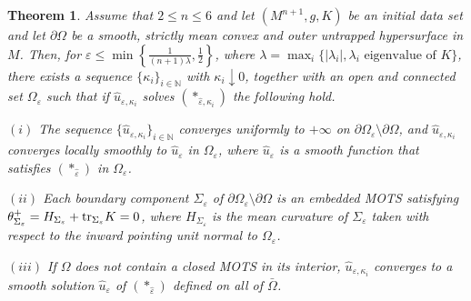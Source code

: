 \documentclass[11pt]{amsart}
\newtheorem{Theorem}{Theorem}
\renewcommand{\epsilon}{\varepsilon}
\def\N{\mathbb{N}}
\def\e{\epsilon}
\def\l{\lambda}
\def\k{\kappa}
\begin{document}
\begin{Theorem}\label{kto0}
Assume that $2\le n\le 6$ and let $(M^{n+1},g,K)$ be an initial data set and let $\partial\Omega$ be a smooth, strictly mean convex and outer untrapped  hypersurface in $M$. Then, for  $\e\le \min\left\{\frac{1}{(n+1)\lambda},\frac12\right\}$, where $\lambda=\max_i\{|\l_i|, \l_i\text{  eigenvalue of  } K\}$, there exists a sequence $\{\k_i\}_{i\in\N}$ with $\kappa_i\downarrow0$, together with an open and connected set $\Omega_\e$  such that if $\hat{u}_{\varepsilon,\k_i}$ solves $(*_{\hat{\varepsilon},\k_i})$ the following hold.

$(i)$ The sequence $\{\hat{u}_{\varepsilon, \k_i}\}_{i\in\N}$ converges  uniformly to $+\infty$ on $\partial\Omega_\e\setminus \partial \Omega$, and 
$\hat{u}_{\varepsilon,\k_i}$ converges locally smoothly to $\hat{u}_{\varepsilon}$ in $\Omega_\e$, where $\hat{u}_{\varepsilon}$ is a smooth function  that satisfies $(*_{\hat{\varepsilon}})$ in ${\Omega}_\e$. 


$(ii)$  Each boundary component $\Sigma_{\e}$ of $\partial \Omega_\e\setminus\partial\Omega$ is an embedded MOTS satisfying $\theta^+_{\Sigma_\e}=H_{\Sigma_{\e}}+{\tr}_{\Sigma_{\e}}K=0$, where $H_{\Sigma_{\e}}$ is the mean curvature of $\Sigma_\e$ taken with respect to the inward pointing unit  normal to $\Omega_\e$.


$(iii)$ If $\Omega$ does not contain a closed MOTS in its interior, $\hat{u}_{\varepsilon,\k_i}$ converges to a smooth solution $\hat{u}_{\varepsilon}$ of $(*_{\hat{\varepsilon}})$ defined on all of $\bar{\Omega}$.  
\end{Theorem}
\end{document}
